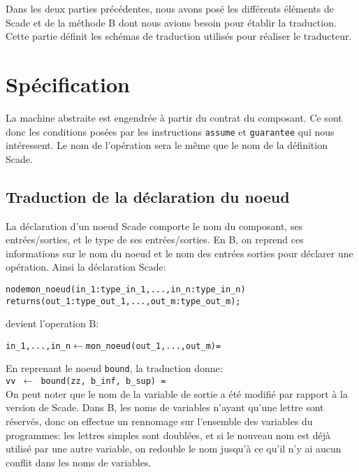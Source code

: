 


Dans les deux parties précédentes, nous avons posé les différents
éléments de Scade et de la méthode B dont nous avions besoin pour
établir la traduction. Cette partie définit les schémas de traduction
utilisés pour réaliser le traducteur. \\

\section{Spécification}

La machine abstraite est engendrée à partir du contrat du composant. Ce sont
donc les conditions posées par les instructions \texttt{assume} et
\texttt{guarantee} qui nous intéressent. Le nom de l'opération sera le même que le
nom de la définition Scade. 

\subsection{Traduction de la déclaration du noeud}
La déclaration d'un noeud Scade comporte le nom du composant, ses
entrées/sorties, et le type de ses entrées/sorties. En B, on reprend ces
informations sur le nom du noeud et le nom des entrées sorties pour déclarer une
opération. Ainsi la déclaration Scade: 
\begin{alltt}
node mon\_noeud (in_1: type\_in_1, ..., in_n: type\_in_n) 
                returns (out_1: type\_out_1, ..., out_m: type\_out_m);
\end{alltt}
devient l'operation B:
\begin{alltt}
in_1, ..., in_n \(\leftarrow\) mon\_noeud(out_1, ..., out_m) =
\end{alltt}

\noindent
En reprenant le noeud \texttt{bound}, la traduction donne:\\
\texttt{vv $\leftarrow$ bound(zz, b\_inf, b\_sup) =}\\
On peut noter que le nom de la variable de sortie a été
modifié par rapport à la version de Scade. Dans B, les noms de variables n'ayant qu'une lettre sont
réservés, donc on effectue un rennomage sur l'ensemble des variables
du programmes: les lettres simples sont doublées, et si le nouveau nom
est déjà utilisé par une autre variable, on redouble le nom jusqu'à ce
qu'il n'y ai aucun conflit dans les noms de variables.

